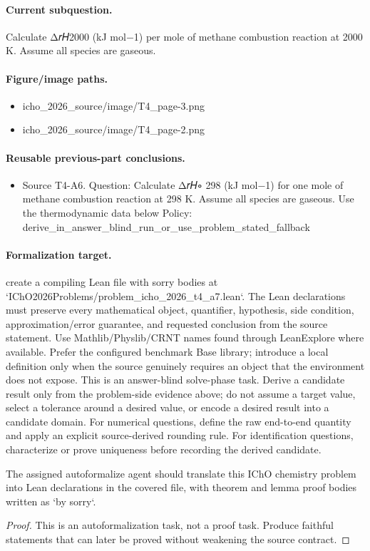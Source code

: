 \paragraph{Current subquestion.}
Calculate Δ𝑟𝐻2000 (kJ mol−1) per mole of methane combustion reaction at 2000 K. Assume all species are gaseous.

\paragraph{Figure/image paths.}
\begin{itemize}
\item icho\_2026\_source/image/T4\_page-3.png
\item icho\_2026\_source/image/T4\_page-2.png
\end{itemize}

\paragraph{Reusable previous-part conclusions.}
\begin{itemize}
\item Source T4-A6. Question: Calculate Δ𝑟𝐻∘ 298 (kJ mol−1) for one mole of methane combustion reaction at 298 K. Assume all species are gaseous. Use the thermodynamic data below Policy: derive\_in\_answer\_blind\_run\_or\_use\_problem\_stated\_fallback
\end{itemize}

\paragraph{Formalization target.}
create a compiling Lean file with sorry bodies at `IChO2026Problems/problem\_icho\_2026\_t4\_a7.lean`.
The Lean declarations must preserve every mathematical object, quantifier, hypothesis, side condition, approximation/error guarantee, and requested conclusion from the source statement.
Use Mathlib/Physlib/CRNT names found through LeanExplore where available. Prefer the configured benchmark Base library; introduce a local definition only when the source genuinely requires an object that the environment does not expose.
This is an answer-blind solve-phase task. Derive a candidate result only from the problem-side evidence above; do not assume a target value, select a tolerance around a desired value, or encode a desired result into a candidate domain.
For numerical questions, define the raw end-to-end quantity and apply an explicit source-derived rounding rule. For identification questions, characterize or prove uniqueness before recording the derived candidate.

\begin{theorem}
\label{thm:physics:icho_2026_t4_a7:target}
The assigned autoformalize agent should translate this IChO chemistry problem into Lean declarations in the covered file, with theorem and lemma proof bodies written as `by sorry`.
\end{theorem}
\begin{proof}
This is an autoformalization task, not a proof task. Produce faithful statements that can later be proved without weakening the source contract.
\end{proof}
